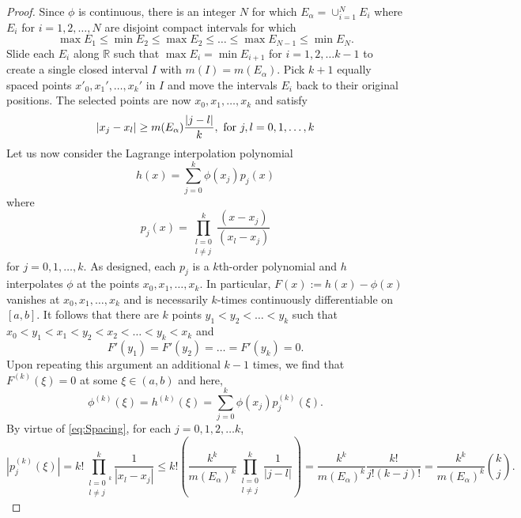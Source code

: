 \documentclass[11pt, letter]{book}
\newcommand\R{\mathbb{R}}
\newcommand{\f}[2]{\frac{#1}{#2}}
\newcommand{\al}{\alpha}
\begin{document}
\begin{proof}
Since $\phi$ is continuous, there is an integer $N$ for which $E_\al = \cup^N_{i=1}E_i$ where $E_i$ for $i=1,2,\dots,N$ are disjoint compact intervals for which
\begin{equation*}
    \max{E_1} \leq \min{E_2} \leq \max{E_2} \leq \dots \leq \max{E_{N-1}}  \leq \min{E_N}.
\end{equation*}
Slide each $E_i$ along $\R$ such that $\max{E_i} = \min{E_{i+1}}$ for $i=1,2,\dots k-1$ to create a single closed interval $I$ with $m(I) = m(E_\al)$. Pick $k+1$ equally spaced points $x'_0,x_1',\dots,x_k'$ in $I$ and move the intervals $E_i$ back to their original positions. The selected points are now $x_0,x_1,\dots,x_k$ and satisfy
\begin{equation}\label{eq:Spacing}
    \abs{x_j - x_l} \geq m(E_\al)\f{\abs{j-l}}{k}, \mbox{ for } j,l = 0,1,\dots,k 
\end{equation}
Let us now consider the Lagrange interpolation polynomial
\begin{equation*}
    h(x)=\sum_{j=0}^k\phi(x_j)p_j(x)
\end{equation*}
where
\begin{equation*}
    p_j(x)=\prod_{\substack{l=0\\l\neq j}}^k\frac{(x-x_j)}{(x_l-x_j)}
\end{equation*}
for $j=0,1,\dots,k$. As designed, each $p_j$ is a $k$th-order polynomial and $h$ interpolates $\phi$ at the points $x_0,x_1,\dots,x_k$. In particular, $F(x):=h(x)-\phi(x)$ vanishes at $x_0,x_1,\dots,x_k$ and is necessarily $k$-times continuously differentiable on $[a,b]$. It follows that there are $k$ points $y_1<y_2<\dots < y_k$ such that $x_0 < y_1 < x_1 < y_2 < x_2 < \dots < y_k < x_k$ and
\begin{equation*}
    F'(y_1) = F'(y_2) = \dots = F'(y_k) = 0.
\end{equation*}
Upon repeating this argument an additional $k-1$ times, we find that $F^{(k)}(\xi) = 0$ at some $\xi\in (a,b)$ and here,
\begin{equation*}
    \phi^{(k)}(\xi) = h^{(k)}(\xi) = \sum_{j=0}^k \phi(x_j)p_j^{(k)}(\xi).
\end{equation*}
By virtue of \eqref{eq:Spacing}, for each $j=0,1,2,\dots k$,
\begin{equation*}
|p_j^{(k)}(\xi)|=k!\prod_{\substack{l=0\\l\neq j}^k}^k\frac{1}{|x_l-x_j|}\leq k!\left(\frac{k^k}{m(E_\alpha)^k}\prod_{\substack{l=0\\l\neq j}}^k\frac{1}{|j-l|}\right)=\frac{ k^k}{m(E_\alpha)^k}\frac{k!}{j!(k-j)!}=\frac{k^k}{m(E_\alpha)^k} {k\choose j}.

\end{equation*}
\end{proof}
\end{document}
